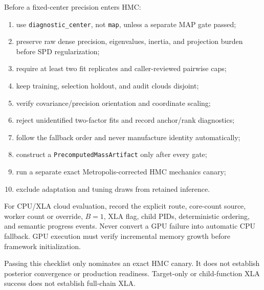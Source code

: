 Before a fixed-center precision enters HMC:
\begin{enumerate}[label=(\roman*)]
  \item use \texttt{diagnostic\_center}, not \texttt{map}, unless a separate
    MAP gate passed;
  \item preserve raw dense precision, eigenvalues, inertia, and projection
    burden before SPD regularization;
  \item require at least two fit replicates and caller-reviewed pairwise caps;
  \item keep training, selection holdout, and audit clouds disjoint;
  \item verify covariance/precision orientation and coordinate scaling;
  \item reject unidentified two-factor fits and record anchor/rank diagnostics;
  \item follow the fallback order and never manufacture identity automatically;
  \item construct a \texttt{PrecomputedMassArtifact} only after every gate;
  \item run a separate exact Metropolis-corrected HMC mechanics canary;
  \item exclude adaptation and tuning draws from retained inference.
\end{enumerate}

For CPU/XLA cloud evaluation, record the explicit route, core-count source,
worker count or override, $B=1$, XLA flag, child PIDs, deterministic ordering,
and semantic progress events.  Never convert a GPU failure into automatic CPU
fallback.  GPU execution must verify incremental memory growth before framework
initialization.

Passing this checklist only nominates an exact HMC canary.  It does not
establish posterior convergence or production readiness.  Target-only or
child-function XLA success does not establish full-chain XLA.
